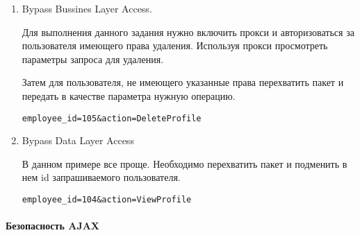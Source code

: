 \documentclass{article}
\begin{document}
\begin{enumerate}
\item Bypass Bussines Layer Access.

Для выполнения данного задания нужно включить прокси и авторизоваться за пользователя имеющего права удаления. Используя прокси просмотреть параметры запроса для удаления.

Затем для пользователя, не имеющего указанные права перехватить пакет и передать в качестве параметра нужную операцию.

\begin{verbatim}
employee_id=105&action=DeleteProfile
\end{verbatim}


\item Bypass Data Layer Access

В данном примере все проще. Необходимо перехватить пакет и подменить в нем id запрашиваемого пользователя.
\begin{verbatim}
employee_id=104&action=ViewProfile
\end{verbatim}
\end{enumerate}

\paragraph{Безопасность AJAX}
~
\end{document}
